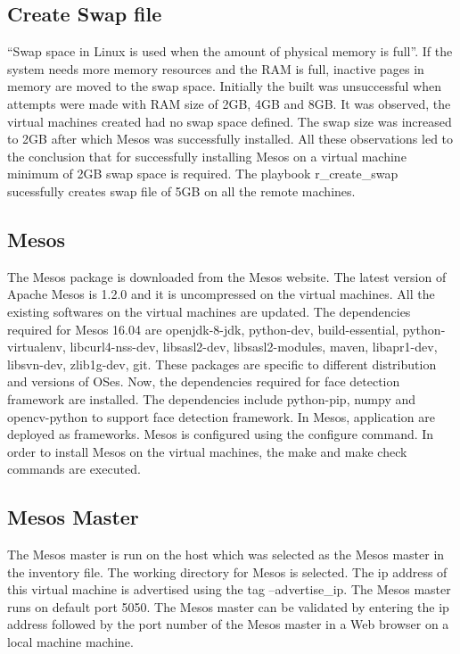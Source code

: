 \documentclass[9pt,twocolumn,twoside]{../../styles/osajnl}
\begin{document}
\subsection{Create Swap file}
``Swap space in Linux is used when the amount of physical memory is
full''. If the system needs more memory resources and the RAM is full,
inactive pages in memory are moved to the swap space. Initially the
built was unsuccessful when attempts were made with RAM size of 2GB,
4GB and 8GB. It was observed, the virtual machines created had no swap
space defined. The swap size was increased to 2GB after which Mesos
was successfully installed. All these observations led to the
conclusion that for successfully installing Mesos on a virtual machine
minimum of 2GB swap space is required. The playbook r\_create\_swap
sucessfully creates swap file of 5GB on all the remote machines.

\subsection{Mesos}
The Mesos package is downloaded from the Mesos website. The latest
version of Apache Mesos is 1.2.0 and it is uncompressed on the virtual
machines. All the existing softwares on the virtual machines are
updated.  The dependencies required for Mesos 16.04 are openjdk-8-jdk,
python-dev, build-essential, python-virtualenv, libcurl4-nss-dev,
libsasl2-dev, libsasl2-modules, maven, libapr1-dev, libsvn-dev,
zlib1g-dev, git. These packages are specific to different distribution
and versions of OSes. Now, the dependencies required for face
detection framework are installed.  The dependencies include
python-pip, numpy and opencv-python to support face detection
framework. In Mesos, application are deployed as frameworks. Mesos is
configured using the configure command. In order to install Mesos on
the virtual machines, the make and make check commands are executed.

\subsection{Mesos Master}
The Mesos master is run on the host which was selected as the Mesos
master in the inventory file. The working directory for Mesos is
selected. The ip address of this virtual machine is advertised using
the tag --advertise\_ip. The Mesos master runs on default port
5050. The Mesos master can be validated by entering the ip address
followed by the port number of the Mesos master in a Web browser on a
local machine machine.
\end{document}
